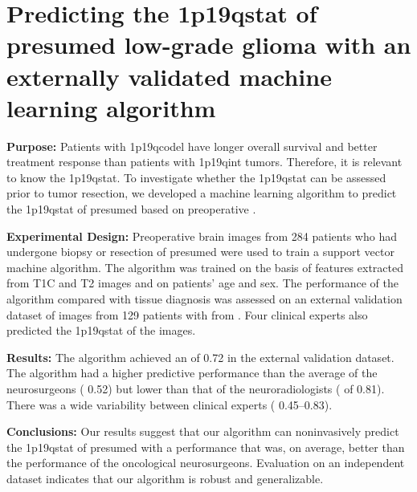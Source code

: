 
\chapter[Predicting the \acl{1p19qstat} of presumed low-grade glioma with an externally validated machine learning algorithm][SVM for 1p/19q prediction of LGG]{Predicting the \acl{1p19qstat} of presumed low-grade glioma with an externally validated machine learning algorithm}\label{chap:LGG1p19q}


\begin{ChapterAbstract}
    \textbf{Purpose:} Patients with \acl{1p19qcodel}  have longer overall survival and better treatment response than patients with \acl{1p19qint} \glspl{tumor}.
    Therefore, it is relevant to know the \acl{1p19qstat}.
    To investigate whether the \acl{1p19qstat} can be assessed prior to \gls{tumor} resection, we developed a machine learning algorithm to predict the \acl{1p19qstat} of presumed  based on preoperative .

    \textbf{Experimental Design:} Preoperative brain  images from 284 patients who had undergone biopsy or resection of presumed  were used to train a support vector machine algorithm.
    The algorithm was trained on the basis of features extracted from \acrlong{T1C} and \acrlong{T2}  images and on patients' age and sex.
    The performance of the algorithm compared with tissue diagnosis was assessed on an external validation dataset of  images from 129 patients with  from .
    Four clinical experts also predicted the \acl{1p19qstat} of the   images.

    \textbf{Results:} The algorithm achieved an  of \num{0.72} in the external validation dataset.
    The algorithm had a higher predictive performance than the average of the neurosurgeons ( \num{0.52}) but lower than that of the neuroradiologists ( of \num{0.81}).
    There was a wide variability between clinical experts ( \numrange{0.45}{0.83}).

    \textbf{Conclusions:} Our results suggest that our algorithm can noninvasively predict the \acl{1p19qstat} of presumed  with a performance that was, on average, better than the performance of the oncological neurosurgeons.
    Evaluation on an independent dataset indicates that our algorithm is robust and generalizable.

\end{ChapterAbstract}

